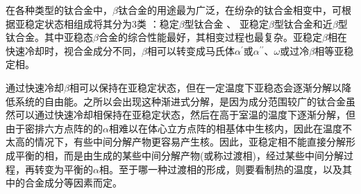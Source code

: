 
在各种类型的钛合金中，$\beta$钛合金的用途最为广泛，在纷杂的钛合金相变中，可根据亚稳定状态相组成将其分为3类 ：稳定$\beta$型钛合金 、 亚稳定$\beta$型钛合金和近$\beta$型钛合金。其中亚稳态$\beta$合金的综合性能最好，其相变过程也最复杂。亚稳定$\beta$相在快速冷却时，视合金成分不同，$ \beta $相可以转变成马氏体$ \alpha^{\prime} $或$ \alpha^{\prime\prime} $、$ \omega $或过冷$ \beta $相等亚稳定相。

通过快速冷却$\beta$相可以保持在亚稳定状态，但在一定温度下亚稳态会逐渐分解以降低系统的自由能。之所以会出现这种渐进式分解，是因为成分范围较广的钛合金虽然可以通过快速冷却相保持在亚稳定状态，然后在高于室温的温度下逐渐分解，但由于密排六方点阵的的$\alpha$相难以在体心立方点阵的相基体中生核内，因此在温度不太高的情况下，有些中间分解产物更容易产生核。因此，亚稳定相不能直接分解形成平衡的相，而是由生成的某些中间分解产物(或称过渡相)，经过某些中间分解过程，再转变为平衡的$\alpha$相。至于哪一种过渡相的形成，则要看制热的温度，以及其中的合金成分等因素而定。

